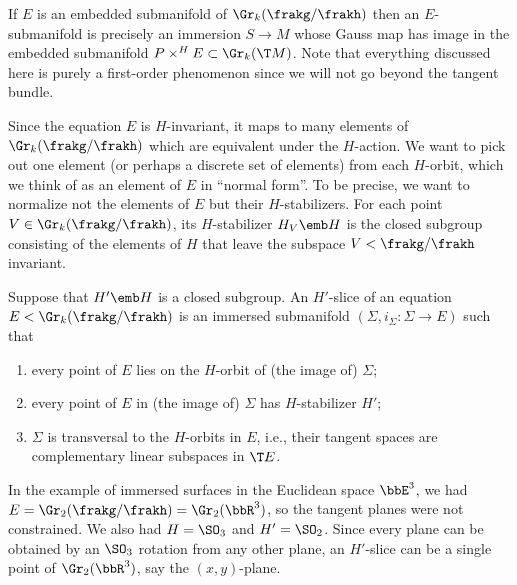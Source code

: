 If $E$ is an embedded submanifold of $\Gr_k(\frakg\slash\frakh)$ then an $E$-submanifold is precisely an immersion $S\to M$ whose Gauss map has image in the embedded submanifold $P\times^H E\subset \Gr_k(\T M)$. Note that everything discussed here is purely a first-order phenomenon since we will not go beyond the tangent bundle.

Since the equation $E$ is $H$-invariant, it maps to many elements of $\Gr_k(\frakg\slash\frakh)$ which are equivalent under the $H$-action. We want to pick out one element (or perhaps a discrete set of elements) from each $H$-orbit, which we think of as an element of $E$ in ``normal form''. To be precise, we want to normalize not the elements of $E$ but their $H$-stabilizers. For each point $V\in\Gr_k(\frakg\slash\frakh)$, its $H$-stabilizer $H_V\emb H$ is the closed subgroup consisting of the elements of $H$ that leave the subspace $V<\frakg\slash\frakh$ invariant. 

\begin{defn}[$H'$-slice]
    Suppose that $H'\emb H$ is a closed subgroup. An $H'$-slice of an equation $E<\Gr_k(\frakg\slash\frakh)$ is an immersed submanifold $(\varSigma,i_\varSigma:\varSigma\to E)$ such that 
    \begin{enumerate}
        \item every point of $E$ lies on the $H$-orbit of (the image of) $\varSigma$;
        \item every point of $E$ in (the image of) $\varSigma$ has $H$-stabilizer $H'$;
        \item $\varSigma$ is transversal to the $H$-orbits in $E$, i.e., their tangent spaces are complementary linear subspaces in $\T E$.
    \end{enumerate}
\end{defn}

\begin{example}
    In the example of immersed surfaces in the Euclidean space $\bbE^3$, we had $E=\Gr_2(\frakg\slash\frakh)=\Gr_2(\bbR^3)$, so the tangent planes were not constrained. We also had $H=\SO_3$ and $H'=\SO_2$. Since every plane can be obtained by an $\SO_3$ rotation from any other plane, an $H'$-slice can be a single point of $\Gr_2(\bbR^3)$, say the $(x,y)$-plane. 
\end{example}

